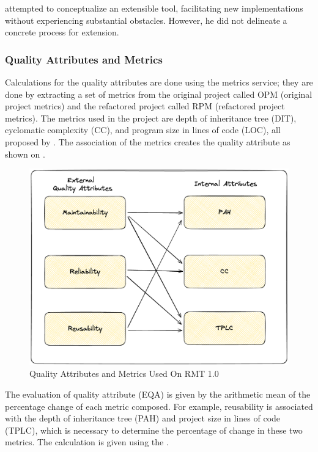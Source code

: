 \textcite{beluzzo2018abordagem} attempted to conceptualize an extensible tool, facilitating new implementations without experiencing substantial obstacles. However, he did not delineate a concrete process for extension.

\subsubsection{Quality Attributes and Metrics}

Calculations for the quality attributes are done using the metrics service; they are done by extracting a set of metrics from the original project called OPM (original project metrics) and the refactored project called RPM (refactored project metrics). The metrics used in the project are depth of inheritance tree (DIT), cyclomatic complexity (CC), and program size in lines of code (LOC), all proposed by \textcite{sommerville2004software}. The association of the metrics creates the quality attribute as shown on .

\begin{figure}[ht!]
\SetCaptionWidth{\textwidth}
\caption{Quality Attributes and Metrics Used On RMT 1.0}
\label{fig-quality-attributes}
\includegraphics[width=\textwidth]{Chapter-2/Figures/QualittyAttributes.png}
\end{figure}
\FloatBarrier

The evaluation of quality attribute (EQA) is given by the arithmetic mean of the percentage change of each metric composed. For example, reusability is associated with the depth of inheritance tree (PAH) and project size in lines of code (TPLC), which is necessary to determine the percentage of change in these two metrics. The calculation is given using the .

